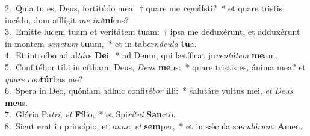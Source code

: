 {2.~}Quia tu es, Deus, fortitúdo mea:~† quare me \textit{re}\textit{pu}\textbf{lí}sti?~* et quare tristis incédo, dum afflígit \textit{me} \textit{i}\textit{ni}\textbf{mí}cus?\\
{3.~}Emítte lucem tuam et veritátem tuam:~† ipsa me deduxérunt, et adduxérunt in montem \textit{san}\textit{ctum} \textbf{tu}um,~* et in taber\textit{ná}\textit{cu}\textit{la} \textbf{tu}a.\\
{4.~}Et introíbo ad al\textit{tá}\textit{re} \textbf{De}i:~* ad Deum, qui lætíficat ju\textit{ven}\textit{tú}\textit{tem} \textbf{me}am.\\
{5.~}Confitébor tibi in cíthara, Deus, \textit{De}\textit{us} \textbf{me}us:~* quare tristis es, ánima mea? et \textit{qua}\textit{re} \textit{con}\textbf{túr}bas me?\\
{6.~}Spera in Deo, quóniam adhuc confi\textit{té}\textit{bor} \textbf{il}li:~* salutáre vultus mei, \textit{et} \textit{De}\textit{us} \textbf{me}us.\\
{7.~}Glória Pa\textit{tri}, \textit{et} \textbf{Fí}lio,~* et Spi\textit{rí}\textit{tu}\textit{i} \textbf{San}cto.\\
{8.~}Sicut erat in princípio, et \textit{nunc}, \textit{et} \textbf{sem}per,~* et in sǽcula sæ\textit{cu}\textit{ló}\textit{rum}. \textbf{A}men.\\

